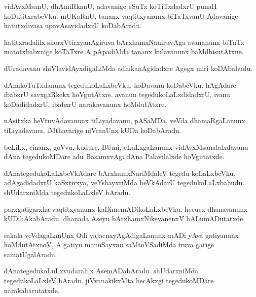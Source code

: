 \documentclass{article}
\begin{document}
\begin{mn}
vidAvxMsanU, dhAmiRkanU, adavanige eSuTx koTiTxdadxrU punaH koDutitxrabeVku. mUKaRnU, tananx 
vaqtitxyanunx biTaTxvanU Adavanige hatutxdivasa upavAsavidadxrU koDabAradu.
\end{mn}

\begin{mn}
hatitxradalilx shorxVtirxyanAgiruva bArxhamxNaniruvAga avananunx biTuTx matotxbabxnige koTaTxre A 
pApadiMda tananx kulavanunx baMdhisutAtxne.
\end{mn}

\begin{mn}
dUradavanu shiVlavidAyxdigaLiMda adhikanAgidadxre Agegx miri koDAbahudu.
\end{mn}

\begin{mn}
dAnakoTuTxdanunx tegedukoLaLxbeVku. koDuvanu koDabeVku. hAgAdare ibabxrU savxgaRkekx hoVgutAtxre. 
avanun tegedukoLaLxdidadxrU, ivanu koDadidadxrU, ibabxrU narakavanunx hoMdutAtxre.
\end{mn}

\begin{mn}
nAsitxka heVtuvAdavanunx tiLiyadavanu, pASaMDa, veVda dhamaRgaLanunx tiLiyadavanu, iMthavarige 
niVranUnx kUDa koDabAradu.
\end{mn}

\begin{mn}
beLiLx, cinanx, goVvu, kudure, BUmi, eLuLxgaLanunx vidAvxMsanalalxdavanu dAna tegedukoMDare adu 
BasamxvAgi dAna Palavilalxde hoVgutatxde.
\end{mn}

\begin{mn}
dAnategedukoLaLxbeVkAdare bArxhamxNariMdaleV tegedu koLaLxbeVku. adAgadidadxrU kaSxtirxya, 
veYshayxriMda beVkAdarU tegedukoLaLxbahudu. shUdarxniMda tegedukoLaLxleV bAradu.
\end{mn}

\begin{mn}
parxgatigarxha vaqtitxyanunx kaDimemADikoLaLxbeVku. hecucx dhanavanunx kUDihAkabAradu. dhanada Aseyu 
bArxhamxNikeyanenxV hALumADutatxde.
\end{mn}

\begin{mn}
sakala veVdagaLanUnx Odi yajacnxyAgAdigaLanunx mADi yAva gatiyanunx hoMdutAtxnoV, A gatiyu 
manuSayxnu saMtoVSadiMda iruva gatige samatUgalAradu.
\end{mn}

\begin{mn}
dAnategedukoLuLxvudaralilx AsemADabAradu. shUdarxniMda tegedukoLaLxleV bAradu. jiVvanakikxMta 
hecAkxgi tegedukoMDare narakabarutatxde.
\end{mn}
\end{document}
